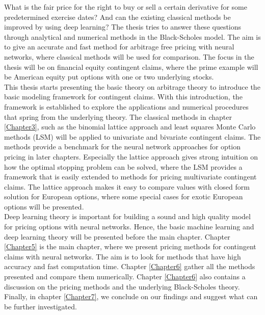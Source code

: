 What is the fair price for the right to buy or sell a certain derivative for some predetermined exercise dates? And can the existing classical methods be improved by using deep learning? The thesis tries to answer these questions through analytical and numerical methods in the Black-Scholes model. The aim is to give an accurate and fast method for arbitrage free pricing with neural networks, where classical methods will be used for comparison. The focus in the thesis will be on financial equity contingent claims, where the prime example will be American equity put options with one or two underlying stocks.\\

This thesis starts presenting the basic theory on arbitrage theory to introduce the basic modeling framework for contingent claims. With this introduction, the framework is established to explore the applications and numerical procedures that spring from the underlying theory. The classical methods in chapter \ref{Chapter3}, such as the binomial lattice approach and least squares Monte Carlo methods (LSM) will be applied to univariate and bivariate contingent claims. The methods provide a benchmark for the neural network approaches for option pricing in later chapters. Especially the lattice approach gives strong intuition on how the optimal stopping problem can be solved, where the LSM provides a framework that is easily extended to methods for pricing multivariate contingent claims. The lattice approach makes it easy to compare values with closed form solution for European options, where some special cases for exotic European options will be presented. \\

Deep learning theory is important for building a sound and high quality model for pricing options with neural networks. Hence, the basic machine learning and deep learning theory will be presented before the main chapter. Chapter \ref{Chapter5} is the main chapter, where we present pricing methods for contingent claims with neural networks. The aim is to look for methods that have high accuracy and fast computation time. Chapter \ref{Chapter6} gather all the methods presented and compare them numerically. Chapter \ref{Chapter6} also contains a discussion on the pricing methods and the underlying Black-Scholes theory. Finally, in chapter \ref{Chapter7}, we conclude on our findings and suggest what can be further investigated.


